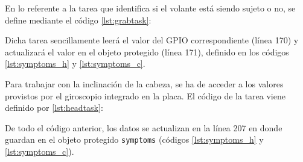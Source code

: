 En lo referente a la tarea que identifica si el volante está siendo sujeto o no, se
define mediante el código \ref{lst:grabtask}:



Dicha tarea sencillamente leerá el valor del GPIO correspondiente (línea 170) y actualizará
el valor en el objeto protegido (línea 171), definido en los códigos \ref{lst:symptoms_h}
y \ref{lst:symptoms_c}.

Para trabajar con la inclinación de la cabeza, se ha de acceder a los valores provistos por
el giroscopio integrado en la placa. El código de la tarea viene definido por
\ref{lst:headtask}:



De todo el código anterior, los datos se actualizan en la línea 207 en donde guardan en
el objeto protegido \texttt{symptoms} (códigos \ref{lst:symptoms_h} y \ref{lst:symptoms_c}).
